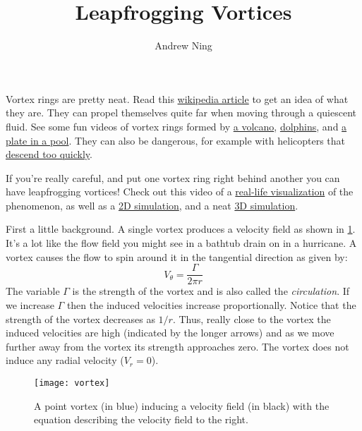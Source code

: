 \documentclass{article}
\begin{document}
\author{Andrew Ning}
\title{Leapfrogging Vortices}
\date{}  %
\maketitle

Vortex rings are pretty neat.  Read this \href{https://en.wikipedia.org/wiki/Vortex_ring}{wikipedia article} to get an idea of what they are.  They can propel themselves quite far when moving through a quiescent fluid.  See some fun videos of vortex rings formed by \href{https://www.youtube.com/watch?v=VbV98Z0QP-k}{a volcano}, \href{https://www.youtube.com/watch?v=ks3aQhEohTE}{dolphins}, and  \href{https://www.youtube.com/watch?v=72LWr7BU8Ao}{a plate in a pool}.  They can also be dangerous, for example with helicopters that \href{https://youtu.be/wddpsnvu0PM?t=75}{descend too quickly}.

If you're really careful, and put one vortex ring right behind another you can have leapfrogging vortices!  Check out this video of a \href{https://youtu.be/Yydb9Mqg9TY}{real-life visualization} of the phenomenon, as well as a \href{https://youtu.be/0LP-MgrXtIM}{2D simulation}, and a neat \href{https://www.youtube.com/watch?v=SPBMEXX5xBI}{3D simulation}.

First a little background.  A single vortex produces a velocity field as shown in \cref{fig:vortex}.  It's a lot like the flow field you might see in a bathtub drain on in a hurricane.  A vortex causes the flow to spin around it in the tangential direction as given by:
\begin{equation}
V_\theta = \frac{\Gamma}{2 \pi r}
\end{equation}
The variable $\Gamma$ is the strength of the vortex and is also called the \emph{circulation}.  If we increase $\Gamma$ then the induced velocities increase proportionally.  Notice that the strength of the vortex decreases as $1/r$.  Thus, really close to the vortex the induced velocities are high (indicated by the longer arrows) and as we move further away from the vortex its strength approaches zero.  The vortex does not induce any radial velocity ($V_r = 0$).

\begin{figure}[htb]
\centering
\texttt{[image: vortex]}
\caption{A point vortex (in blue) inducing a velocity field (in black) with the equation describing the velocity field to the right.}
\label{fig:vortex}
\end{figure}
\end{document}
